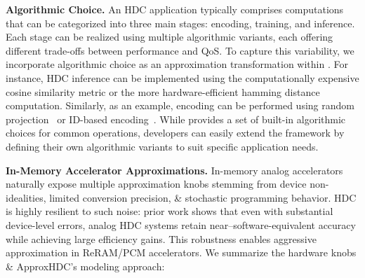 \textbf{Algorithmic Choice.} 
An HDC application typically comprises computations that can be categorized into three main stages: encoding, training, and inference. Each stage can be realized using multiple algorithmic variants, each offering different trade-offs between performance and QoS. To capture this variability, we incorporate algorithmic choice as an approximation transformation within \pname{}. For instance, HDC inference can be implemented using the computationally expensive cosine similarity metric or the more hardware-efficient hamming distance computation. Similarly, as an example, encoding can be performed using random projection~\cite{rahimi2016robust} or ID-based encoding~\cite{imani2017voicehd}. While \pname{} provides a set of built-in algorithmic choices for common operations, developers can easily extend the framework by defining their own algorithmic variants to suit specific application needs.

\textbf{In-Memory Accelerator Approximations.} In-memory analog accelerators naturally expose multiple approximation knobs stemming from device non-idealities, limited conversion precision, \& stochastic programming behavior. HDC is highly resilient to such noise: prior work shows that even with substantial device-level errors, analog HDC systems retain near–software-equivalent accuracy while achieving large efficiency gains. This robustness enables aggressive approximation in ReRAM/PCM accelerators. We summarize the hardware knobs \& ApproxHDC’s modeling approach:

